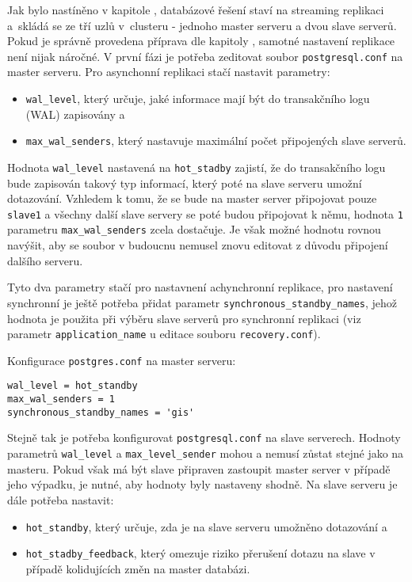 
Jak bylo nastíněno v kapitole , databázové řešení staví na
streaming replikaci a~skládá se ze tří uzlů v~clusteru - jednoho master serveru a
dvou slave serverů. Pokud je správně provedena příprava dle kapitoly
, samotné nastavení replikace není nijak náročné. V
první fázi je potřeba zeditovat soubor \texttt{postgresql.conf} na master
serveru. Pro asynchonní replikaci stačí nastavit parametry:
\begin{itemize}
  \item \texttt{wal\_level}, který určuje, jaké informace mají být do transakčního
    logu (WAL) zapisovány a
  \item \texttt{max\_wal\_senders}, který nastavuje maximální počet připojených
    slave serverů.
\end{itemize}

Hodnota \texttt{wal\_level} nastavená na \texttt{hot\_stadby} zajistí, že do
transakčního logu bude zapisován takový typ informací, který poté na slave
serveru umožní dotazování. Vzhledem k tomu, že se bude na master
server připojovat pouze \texttt{slave1} a všechny další slave servery se poté
budou připojovat k němu, hodnota \texttt{1} parametru \texttt{max\_wal\_senders}
zcela dostačuje. Je však možné hodnotu rovnou navýšit, aby se soubor v budoucnu
nemusel znovu editovat z důvodu připojení dalšího serveru.

Tyto dva parametry stačí pro nastavnení achynchronní replikace, pro nastavení
synchronní je ještě potřeba přidat parametr
\texttt{synchronous\_standby\_names}, jehož hodnota je použita při výběru slave
serverů pro synchronní replikaci (viz parametr \texttt{application\_name} u
editace souboru \texttt{recovery.conf}).

Konfigurace \texttt{postgres.conf} na master serveru:
\begin{lstlisting}
wal_level = hot_standby
max_wal_senders = 1
synchronous_standby_names = 'gis'
\end{lstlisting}

Stejně tak je potřeba konfigurovat \texttt{postgresql.conf} na slave serverech.
Hodnoty parametrů \texttt{wal\_level} a \texttt{max\_level\_sender} mohou a
nemusí zůstat stejné jako na masteru. Pokud však má být slave připraven
zastoupit master server v případě jeho výpadku, je nutné, aby hodnoty byly
nastaveny shodně.  Na slave serveru je dále potřeba nastavit:
\begin{itemize}
  \item\texttt{hot\_standby}, který určuje, zda je na slave serveru umožněno
    dotazování a
  \item\texttt{hot\_stadby\_feedback}, který omezuje riziko přerušení
    dotazu na slave v případě kolidujících změn na master databázi.
\end{itemize}


